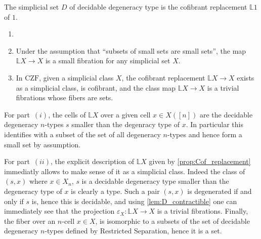 \documentclass[reqno,10pt,a4paper,oneside]{amsart}
\makeatletter
\renewenvironment{proof}[1][\proofname] {\par\pushQED{\qed}\normalfont\topsep6\p@\@plus6\p@\relax\trivlist\item[\hskip\labelsep\bf#1\@addpunct{.}]\ignorespaces}{\popQED\endtrivlist\@endpefalse}
\numberwithin{equation}{section}
\theoremstyle{mythm}
\theoremstyle{mydef}
\theoremstyle{myrmk}
\newcommand{\co}{\colon}
\makeatother
\begin{document}
\begin{corollary}
The simplicial set $D$ of decidable degeneracy type is the cofibrant replacement $\mathbb{L} 1$ of $1$.
\end{corollary}

\begin{corollary} \label{cor:cofibrant_smallness}
\begin{enumerate}[$(i)$]

\item[]
 
\item Under the assumption that ``subsets of small sets are small sets'', the map $\mathbb{L} X \rightarrow X$ is a small fibration for any simplicial set $X$.

\item In $\mathrm{CZF}$, given a simplicial class $X$, the cofibrant replacement $\mathbb{L} X \rightarrow X$ exists as a simplicial class, is cofibrant, and the class map $\mathbb{L} X \rightarrow X$ is a trivial fibrations whose fibers are sets.

\end{enumerate}
\end{corollary}

\begin{proof}

For part~$(i)$, the cells of $\mathbb{L} X$ over a given cell $x \in X([n])$ are the decidable degeneracy $n$-types $s$ smaller than the degenracy type of $x$. In particular this identifies with a subset of the set of all degeneracy $n$-types and hence form a small set by assumption.

For part~$(ii)$, the explicit description of $\mathbb{L} X$ given by \cref{prop:Cof_replacement} immediatly allows to make sense of it as a simplicial class. Indeed the class of $(s,x)$ where $x\in X_n$, $s$ is a decidable degeneracy type smaller than the degeneracy type of $x$ is clearly a type. Such a pair $(s,x)$ is degenerated if and only if $s$ is, hence this is decidable, and using \cref{lem:D_contractible} one can immediately see that the projection $\varepsilon_X \co \mathbb{L} X \rightarrow X$ is a trivial fibrations. Finally, the fiber over an $n$-cell $x \in X$, is isomorphic to a subsets of the set of decidable degeneracy $n$-types defined by Restricted Separation, hence it is a set.
\end{proof}
\end{document}
